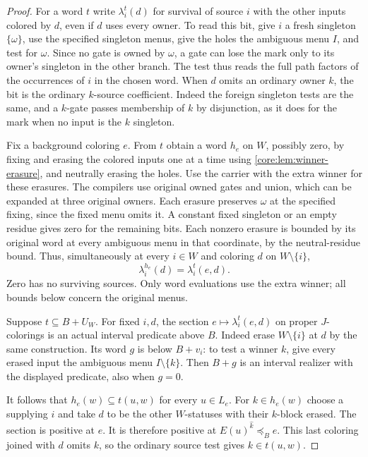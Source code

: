\begin{proof}
For a word $t$ write $\lambda_i^t(d)$ for survival of source $i$
with the other inputs colored by $d$, even if $d$ uses every owner.
To read this bit, give $i$ a fresh singleton $\{\omega\}$, use the
specified singleton menus, give the holes the ambiguous menu $I$,
and test for $\omega$. Since no gate is owned by $\omega$, a gate
can lose the mark only to its owner's singleton in the other branch.
The test thus reads the full path factors of the occurrences of $i$
in the chosen word. When $d$ omits an
ordinary owner $k$, the bit is the ordinary $k$-source coefficient.
Indeed the foreign singleton tests are the same, and a $k$-gate
passes membership of $k$ by disjunction, as it does for the mark
when no input is the $k$ singleton.

Fix a background coloring $e$. From $t$ obtain a word $h_e$ on $W$,
possibly zero, by fixing and erasing the colored inputs one at a time
using \cref{core:lem:winner-erasure}, and neutrally erasing the holes.
Use the carrier with the extra winner for these erasures. The
compilers use original owned gates and union, which can be expanded
at three original owners. Each erasure preserves $\omega$ at the
specified fixing, since the fixed menu omits it. A constant fixed
singleton or an empty residue gives zero for the remaining
bits. Each nonzero erasure is bounded by its original word at every
ambiguous menu in that coordinate, by the neutral-residue bound.
Thus, simultaneously at every $i\in W$ and coloring $d$ on
$W\setminus\{i\}$,
\[
 \lambda_i^{h_e}(d)=\lambda_i^t(e,d).
\]
Zero has no surviving sources. Only word evaluations use the extra
winner; all bounds below concern the original menus.

Suppose $t\subseteq B+U_W$. For fixed $i,d$, the section
$e\mapsto\lambda_i^t(e,d)$ on proper $J$-colorings is an actual
interval predicate above $B$. Indeed erase $W\setminus\{i\}$ at $d$
by the same construction. Its word $g$ is below $B+v_i$: to test a
winner $k$, give every erased input the ambiguous menu
$I\setminus\{k\}$. Then $B+g$ is an interval realizer with the
displayed predicate, also when $g=0$.

It follows that $h_e(w)\subseteq t(u,w)$ for every $u\in L_e$.
For $k\in h_e(w)$ choose a supplying $i$ and take $d$ to be the other
$W$-statuses with their $k$-block erased. The section is positive at
$e$. It is therefore positive at $E(u)^{\widehat k}\preceq_B e$.
This last coloring joined with $d$ omits $k$, so the ordinary source
test gives $k\in t(u,w)$.


\end{proof}
